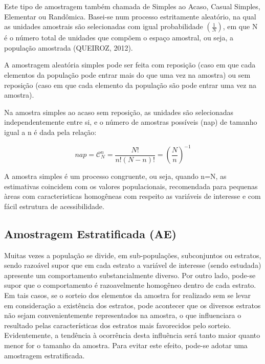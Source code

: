 \inic Este tipo de amostragem também chamada de Simples ao Acaso,
Casual Simples, Elementar ou Randômica. Basei-se num processo
estritamente aleatório, na qual as unidades amostrais são
selecionadas com igual probabilidade $(\frac{1}{N})$, em que N é o
número total de unidades que compõem o espaço amostral, ou seja, a
população amostrada (QUEIROZ, 2012).\vskip0.3cm


A amostragem aleatória simples pode ser feita com reposição (caso em
que cada elementos da população pode entrar mais do que uma vez na
amostra) ou sem reposição (caso em que cada elemento da população
são pode entrar uma vez na amostra).\vskip0.3cm



Na amostra simples ao acaso sem reposição, as unidades são selecionadas independentemente entre si, e o número de amostras possíveis (nap) de tamanho igual a n é dada pela relação:


\begin{equation}\label{nap}
    nap=\mathcal{C}_{N}^{n}=\frac{N!}{n!(N-n)!}=\left(\frac{N}{n}\right)^{-1}
\end{equation}

A amostra simples é um processo congruente, ou seja, quando n=N, as estimativas coincidem com os valores populacionais, recomendada para pequenas àreas com caracteristicas homogêneas com respeito as variáveis de interesse e com fácil estrutura de acessibilidade.

\subsection{Amostragem Estratificada (AE)}

\inic Muitas vezes a população se divide, em sub-populações,
subconjuntos ou estratos, sendo razoável supor que em cada estrato
a variável de interesse (sendo estudada) apresente um
comportamento substancialmente diverso. Por outro lado, pode-se
supor que o comportamento é razoavelmente homogêneo dentro de cada
estrato. Em tais casos, se o sorteio dos elementos da amostra for
realizado sem se levar em consideração a existência dos estratos,
pode acontecer que os diversos estratos não sejam convenientemente
representados na amostra, o que influenciara o resultado pelas
características dos estratos mais favorecidos pelo sorteio.
Evidentemente, a tendência à ocorrência desta influência será
tanto maior quanto menor for o tamanho da amostra. Para evitar
este efeito, pode-se adotar uma amostragem estratificada.\vskip0.3cm

